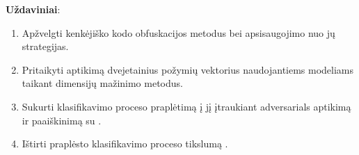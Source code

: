 \vspace{10pt}
\textbf{Uždaviniai}:
\begin{enumerate}
    \item Apžvelgti kenkėjiško kodo obfuskacijos metodus bei apsisaugojimo nuo jų strategijas.
    \item Pritaikyti  aptikimą dvejetainius požymių vektorius naudojantiems modeliams taikant dimensijų mažinimo metodus.
    \item Sukurti klasifikavimo proceso praplėtimą į jį įtraukiant \glspl{adversarial} aptikimą ir paaiškinimą su \LIME.
    \item Ištirti praplėsto klasifikavimo proceso tikslumą .
\end{enumerate}